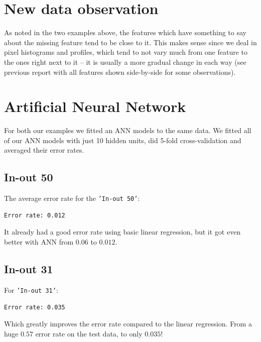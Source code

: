 \section{New data observation}
As noted in the two examples above, the features which have something to say about the missing feature tend to be close to it. This makes sense since we deal in pixel histograms and profiles, which tend to not vary much from one feature to the ones right next to it -- it is usually a more gradual change in each way (see previous report with all features shown side-by-side for some observations).


\section{Artificial Neural Network}
For both our examples we fitted an ANN models to the same data. We fitted all of our ANN models with just 10 hidden units, did 5-fold cross-validation and averaged their error rates. 

\subsection*{In-out 50}
The average error rate for the \texttt{'In-out 50'}:

\begin{verbatim}
Error rate: 0.012
\end{verbatim}

It already had a good error rate using basic linear regression, but it got even better with ANN from $0.06$ to $0.012$.

\subsection*{In-out 31}
For \texttt{'In-out 31'}:

\begin{verbatim}
Error rate: 0.035
\end{verbatim}

Which greatly improves the error rate compared to the linear regression. From a huge $0.57$ error rate on the test data, to only $0.035$!

